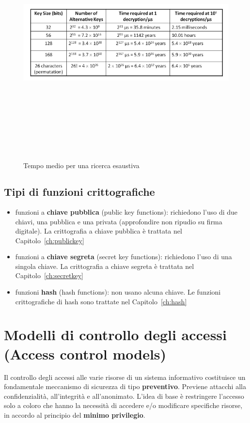 \begin{figure}[htbp]
	\centering%
	\subfigure%
	{\includegraphics[height=12cm, width=13cm, keepaspectratio]{Immagini/introduzione/tab_tempi.png}}
	\caption{Tempo medio per una ricerca esaustiva \label{fig:tab_tempi}} 	
\end{figure}

\subsection{Tipi di funzioni crittografiche}
\begin{itemize} 
  \item funzioni a \textbf{chiave pubblica} (public key functions): richiedono l'uso di due chiavi, una pubblica e una privata (approfondire non ripudio su firma digitale). La crittografia a chiave pubblica è trattata nel Capitolo~\ref{ch:publickey}
  \item funzioni a \textbf{chiave segreta} (secret key functions): richiedono l'uso di una singola chiave. La crittografia a chiave segreta è trattata nel Capitolo~\ref{ch:secretkey}
  \item funzioni \textbf{hash} (hash functions): non usano alcuna chiave. Le funzioni crittografiche di hash sono trattate nel Capitolo~\ref{ch:hash}
\end{itemize}

\section{Modelli di controllo degli accessi (Access control models)}
Il controllo degli accessi alle varie risorse di un sistema informativo costituisce un fondamentale meccanismo di sicurezza di tipo \textbf{preventivo}. Previene attacchi alla confidenzialità, all'integrità e all'anonimato. L'idea di base è restringere l'accesso solo a coloro che hanno la necessità di accedere e/o modificare specifiche risorse, in accordo al principio del \textbf{minimo privilegio}.


